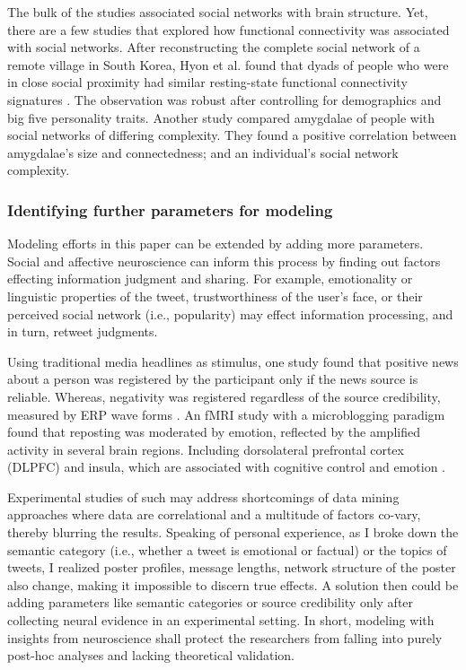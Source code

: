 \documentclass[11pt,a4paper]{article}
\begin{document}
        The bulk of the studies associated social networks with brain structure. Yet, there are a few studies that explored how functional connectivity was associated with social networks. After reconstructing the complete social network of a remote village in South Korea, Hyon et al. found that dyads of people who were in close social proximity had similar resting-state functional connectivity signatures \cite{hyon_similarity_2020}. The observation was robust after controlling for demographics and big five personality traits. Another study compared amygdalae of people with social networks of differing complexity. They found a positive correlation between amygdalae's size and connectedness; and an individual's social network complexity.
        
        \subsubsection{Identifying further parameters for modeling}
        Modeling efforts in this paper can be extended by adding more parameters. Social and affective neuroscience can inform this process by finding out factors effecting information judgment and sharing. For example, emotionality or linguistic properties of the tweet, trustworthiness of the user's face, or their perceived social network (i.e., popularity) may effect information processing, and in turn, retweet judgments. 
        
        Using traditional media headlines as stimulus, one study found that positive news about a person was registered by the participant only if the news source is reliable. Whereas, negativity was registered regardless of the source credibility, measured by ERP wave forms \cite{baum_negative_2021}. An fMRI study with a microblogging paradigm found that reposting was moderated by emotion, reflected by the amplified activity in several brain regions. Including dorsolateral prefrontal cortex (DLPFC) and  insula,  which are associated with cognitive control and emotion \cite{zhang_emotional_2020}. 
        
        Experimental studies of such may address shortcomings of data mining approaches where data are correlational and a multitude of factors co-vary, thereby blurring the results. Speaking of personal experience, as I broke down the semantic category  (i.e., whether a tweet is emotional or factual) or the topics of tweets, I realized poster profiles, message lengths, network structure of the poster also change, making it impossible to discern true effects. A solution then could be adding parameters like semantic categories or source credibility only after collecting neural evidence in an experimental setting. In short, modeling with insights from neuroscience shall protect the researchers from falling into purely post-hoc analyses and lacking theoretical validation.
        
\end{document}

